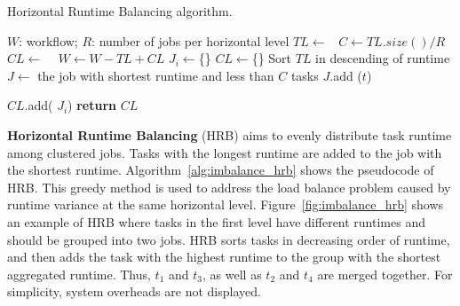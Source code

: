 \documentclass[final,5p,times,twocolumn]{elsarticle}
\begin{document}


\begin{algorithm}[!htb]
	\footnotesize
	\caption{Horizontal Runtime Balancing algorithm.}
	\label{alg:imbalance_hrb}
	\begin{algorithmic}[1]
		\Require $W$: workflow; $R$: number of jobs per horizontal level
				\State $TL\gets $\  
				\State $C \gets TL.size() / R$ 
				\State $CL\gets$  \  
				\State $W \gets W - TL + CL$   
			\EndFor
		\EndProcedure
			\State $J_i\gets$\{\}
			\EndFor
			\State $CL\gets$\{\}
			\State Sort $TL$ in descending of runtime
				\State $J\gets$ the job with shortest runtime and less than $C$ tasks  
				\State $J$.add ($t$) 
				
			\EndFor
			\State  $CL$.add( $J_i$)
			\EndFor
			\State \textbf{return} $CL$
		\EndProcedure
	\end{algorithmic}
\end{algorithm}



\textbf{Horizontal Runtime Balancing} (HRB) aims to evenly distribute task runtime among clustered jobs. Tasks with the longest runtime are added to the job with the shortest runtime. Algorithm~\ref{alg:imbalance_hrb} shows the pseudocode of HRB. This greedy method is used to address the load balance problem caused by runtime variance at the same horizontal level. Figure~\ref{fig:imbalance_hrb} shows an example of HRB where tasks in the first level have different runtimes and should be grouped into two jobs. HRB sorts tasks in decreasing order of runtime, and then adds the task with the highest runtime to the group with the shortest aggregated runtime. Thus, $t_1$ and $t_3$, as well as $t_2$ and $t_4$ are merged together.
For simplicity, system overheads are not displayed.
\end{document}
